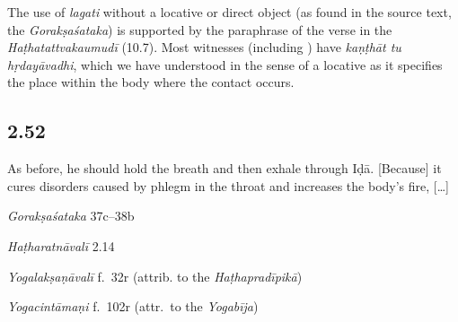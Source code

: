 \begin{ekdosis}
\begin{philcomm}[hp02_051]
The use of \emph{lagati} without a locative or direct object (as found in the source text, the \emph{Gorakṣaśataka}) is supported by the paraphrase of the verse in the \emph{Haṭhatattvakaumudī} (10.7). Most witnesses (including \textalpha) have \emph{kaṇṭhāt tu hṛdayāvadhi}, which we have understood in the sense of a locative as it specifies the place within the body where the contact occurs. 
\end{philcomm}

\subsection*{2.52}
\begin{translation}[hp02_052]
As before, he should hold the breath and then exhale through Iḍā. [Because] it cures disorders caused by phlegm in the throat and increases the body’s fire, [\dots]
\end{translation}

\begin{sources}[hp02_052]
\emph{Gorakṣaśataka} 37c–38b
\begin{versinnote}
\end{versinnote}
\end{sources}

\begin{testimonia}[hp02_052]
\emph{Haṭharatnāvalī} 2.14

\begin{versinnote}
\end{versinnote}

\emph{Yogalakṣaṇāvalī} f.~32r (attrib. to the \emph{Haṭhapradīpikā})
\begin{versinnote}
\end{versinnote}

\emph{Yogacintāmaṇi} f.~102r (attr.~to the \emph{Yogabīja})

\begin{versinnote}
\end{versinnote}


\end{testimonia}
\end{ekdosis}
